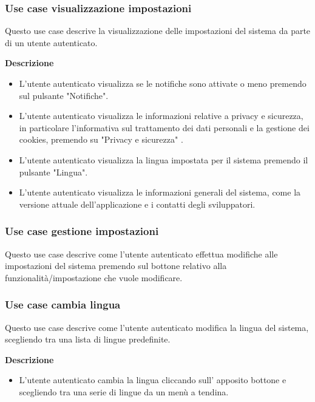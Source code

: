 \documentclass[a4paper,12pt]{article}
\begin{document}
\subsubsection*{Use case visualizzazione impostazioni}

Questo use case descrive la visualizzazione delle impostazioni del sistema da parte di un utente autenticato.

\textbf{Descrizione}
\begin{itemize} \setlength\itemsep{0.01em}
\item L'utente autenticato visualizza se le notifiche sono attivate o meno premendo sul pulsante "Notifiche".
\item L'utente autenticato visualizza le informazioni relative a privacy e sicurezza, in particolare l'informativa sul trattamento dei dati personali e la gestione dei cookies, premendo su "Privacy e sicurezza" .
\item L'utente autenticato visualizza la lingua impostata per il sistema premendo il pulsante "Lingua".
\item L'utente autenticato visualizza le informazioni generali del sistema, come la versione attuale dell'applicazione e i contatti degli sviluppatori.
\end{itemize}

\subsubsection*{Use case gestione impostazioni}

Questo use case descrive come l'utente autenticato effettua modifiche alle impostazioni del sistema premendo sul bottone relativo alla funzionalità/impostazione che vuole modificare.


\subsubsection*{Use case cambia lingua}

Questo use case descrive come l'utente autenticato modifica la lingua del sistema, scegliendo tra una lista di lingue predefinite.

\textbf{Descrizione}
\begin{itemize} \setlength\itemsep{0.01em}
\item L'utente autenticato cambia la lingua cliccando sull' apposito bottone e scegliendo tra una serie di lingue da un menù a tendina.
\end{itemize}
\end{document}
